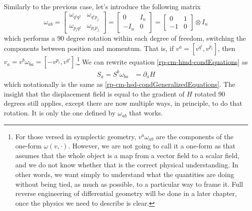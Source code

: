 Similarly to the previous case, let's introduce the following matrix
\begin{equation}\label{rp-cm-hmd-symplecticForm}
	\tag{SF-ND}
	\omega_{ab} = \left[\begin{array}{cc}
		\omega_{q^i q^j} & \omega_{q^i p_j} \\
		\omega_{p_i q^j} & \omega_{p_i p_j} 
	\end{array} \right]= \left[\begin{array}{cc}
		0 & I_n \\
		- I_n & 0 
	\end{array} \right] = \left[\begin{array}{cc}
	0 & 1 \\
	-1 & 0 
\end{array} \right] \otimes I_n
\end{equation}
which performs a 90 degree rotation within each degree of freedom, switching the components between position and momentum. That is, if $v^a = [v^{q^i}, v^{p_i}]$, then $v_a = v^b \omega_{ba}  = [-v^{p_i}, v^{q^i}]$.\footnote{For those versed in symplectic geometry, $v^a \omega_{ab}$ are the components of the one-form $\omega(v, \cdot)$. However, we are not going to call it a one-form as that assumes that the whole object is a map from a vector field to a scalar field, and we do not know whether that is the correct physical understanding. In other words, we want simply to understand what the quantities are doing without being tied, as much as possible, to a particular way to frame it. Full reverse engineering of differential geometry will be done in a later chapter, once the physics we need to describe is clear.} We can rewrite equation \ref{rp-cm-hmd-condEquations} as
\begin{equation}\label{rp-hm-HamiltonSymp}
	\begin{aligned}
		S_a = S^b \omega_{ba}  &= \partial_a H 
	\end{aligned}
\end{equation}
which notationally is the same as \ref{rp-cm-hsd-condGeneralizedEquations}. The insight that the displacement field is equal to the gradient of $H$ rotated 90 degrees still applies, except there are now multiple ways, in principle, to do that rotation. It is only the one defined by $\omega_{ab}$ that works.

